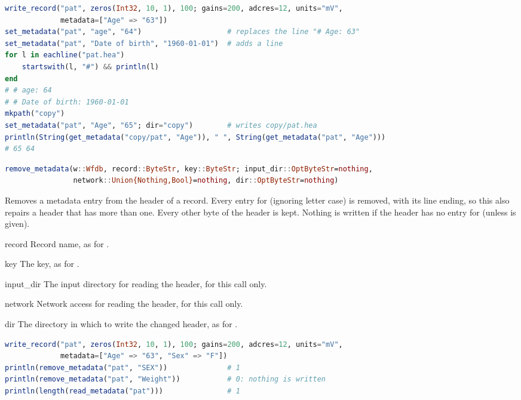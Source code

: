 \begin{lstlisting}[language=Julia,style=example]
write_record("pat", zeros(Int32, 10, 1), 100; gains=200, adcres=12, units="mV",
             metadata=["Age" => "63"])
set_metadata("pat", "age", "64")                    # replaces the line "# Age: 63"
set_metadata("pat", "Date of birth", "1960-01-01")  # adds a line
for l in eachline("pat.hea")
    startswith(l, "#") && println(l)
end
# # age: 64
# # Date of birth: 1960-01-01
mkpath("copy")
set_metadata("pat", "Age", "65"; dir="copy")        # writes copy/pat.hea
println(String(get_metadata("copy/pat", "Age")), " ", String(get_metadata("pat", "Age")))
# 65 64
\end{lstlisting}

\begin{lstlisting}[language=Julia,style=signature]
remove_metadata(w::Wfdb, record::ByteStr, key::ByteStr; input_dir::OptByteStr=nothing,
                network::Union{Nothing,Bool}=nothing, dir::OptByteStr=nothing)
\end{lstlisting}
Removes a metadata entry from the header of a record. Every entry for  (ignoring
letter case) is removed, with its line ending, so this also repairs a header that has more
than one. Every other byte of the header is kept. Nothing is written if the header has no
entry for  (unless  is given).
\begin{params}
\item[record] Record name, as for .
\item[key] The key, as for .
\item[input\_dir] The input directory for reading the header, for this call only.
\item[network] Network access for reading the header, for this call only.
\item[dir] The directory in which to write the changed header, as for
  .
\end{params}
\begin{lstlisting}[language=Julia,style=example]
write_record("pat", zeros(Int32, 10, 1), 100; gains=200, adcres=12, units="mV",
             metadata=["Age" => "63", "Sex" => "F"])
println(remove_metadata("pat", "SEX"))              # 1
println(remove_metadata("pat", "Weight"))           # 0: nothing is written
println(length(read_metadata("pat")))               # 1
\end{lstlisting}

